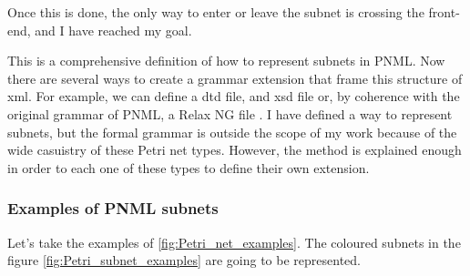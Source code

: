 Once this is done, the only way to enter or leave the subnet is crossing
the front-end, and I have reached my goal.

This is a comprehensive definition of how to represent subnets in PNML. Now
there are several ways to create a grammar extension that frame this structure
of xml. For example, we can define a dtd file\cite{PNML-dtd}, and xsd file
\cite{PNML-xsd1,PNML-xsd2} or, by coherence with the original grammar of PNML, a Relax NG file \cite{PNML-relaxng.org}. I have defined a way to represent subnets, but the formal grammar is outside the scope of my work because of the wide casuistry of these Petri net types.
However, the method is explained enough in order to each one of these types to define their own extension. 

 

\subsubsection{Examples of PNML subnets}

Let's take the examples of \ref{fig:Petri_net_examples}. The coloured subnets in the figure \ref{fig:Petri_subnet_examples}  are going to be represented.

